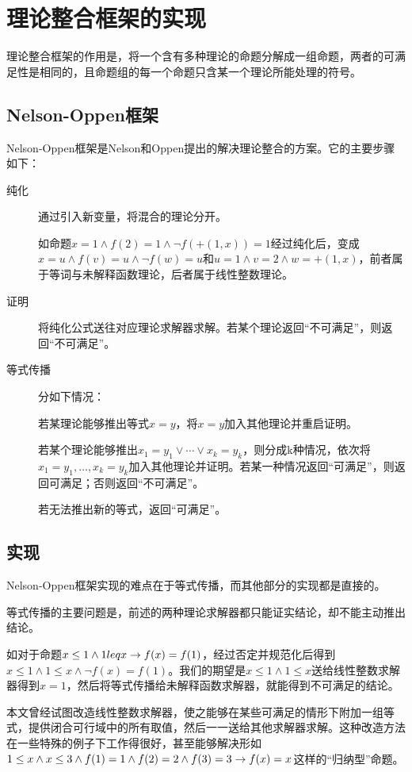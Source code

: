 \chapter{理论整合框架的实现}
\label{chap:no}

理论整合框架的作用是，将一个含有多种理论的命题分解成一组命题，两者的可满足性是相同的，且命题组的每一个命题只含某一个理论所能处理的符号。

\section{Nelson-Oppen框架}
Nelson-Oppen框架\cite{Nelson:1979:SCD:357073.357079}是Nelson和Oppen提出的解决理论整合的方案。它的主要步骤如下：
\begin{description}
  \item[纯化] 通过引入新变量，将混合的理论分开。

    如命题$x = 1 \land f(2) = 1 \land \lnot f(+(1,x))=1$经过纯化后，变成$x = u \land f(v) = u \land \lnot f(w)=u$和$u = 1 \land v = 2 \land w = +(1, x)$，前者属于等词与未解释函数理论，后者属于线性整数理论。
  \item[证明] 将纯化公式送往对应理论求解器求解。若某个理论返回``不可满足''，则返回``不可满足''。
  \item[等式传播] 分如下情况：

    若某理论能够推出等式$x = y$，将$x = y$加入其他理论并重启证明。

    若某个理论能够推出$x_1 = y_1 \lor \cdots \lor x_k = y_k$，则分成k种情况，依次将$x_1 = y_1, \dots, x_k = y_k$加入其他理论并证明。若某一种情况返回``可满足''，则返回可满足；否则返回``不可满足''。

    若无法推出新的等式，返回``可满足''。
\end{description}

\section{实现}
Nelson-Oppen框架实现的难点在于等式传播，而其他部分的实现都是直接的。

等式传播的主要问题是，前述的两种理论求解器都只能证实结论，却不能主动推出结论。

如对于命题$x \leq 1 \land 1 leq x \rightarrow f(x) = f(1)$，经过否定并规范化后得到$x \leq 1 \land 1 \leq x \land \lnot f(x) = f(1)$。我们的期望是$x \leq 1 \land 1 \leq x$送给线性整数求解器得到$x=1$，然后将等式传播给未解释函数求解器，就能得到不可满足的结论。

本文曾经试图改造线性整数求解器，使之能够在某些可满足的情形下附加一组等式，提供闭合可行域中的所有取值，然后一一送给其他求解器求解。这种改造方法在一些特殊的例子下工作得很好，甚至能够解决形如$1 \leq x \land x \leq 3 \land f(1)=1 \land f(2)=2 \land f(3)=3 \rightarrow f(x)=x$这样的``归纳型''命题。

